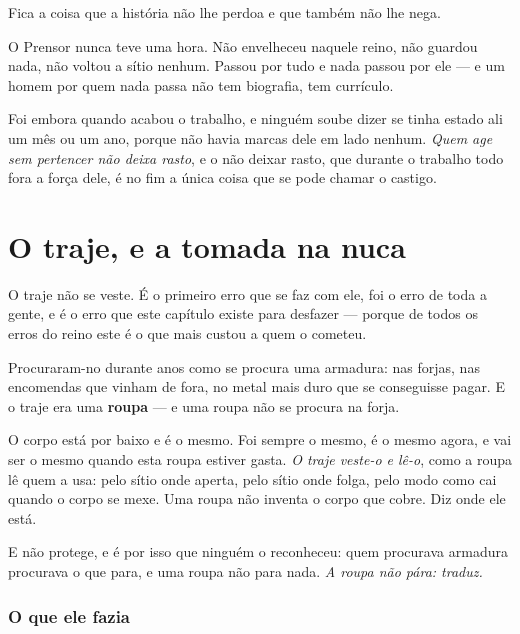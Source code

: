 \documentclass[livro.tex]{subfiles}
\begin{document}
Fica a coisa que a história não lhe perdoa e que também não lhe nega.

\medskip

O Prensor nunca teve uma hora. Não envelheceu naquele reino, não guardou nada, não voltou a sítio
nenhum. Passou por tudo e nada passou por ele --- e um homem por quem nada passa não tem
biografia, tem currículo.

\medskip

Foi embora quando acabou o trabalho, e ninguém soube dizer se tinha estado ali um mês ou um ano,
porque não havia marcas dele em lado nenhum. \emph{Quem age sem pertencer não deixa rasto}, e o
não deixar rasto, que durante o trabalho todo fora a força dele, é no fim a única coisa que se
pode chamar o castigo.





\chapter{O traje, e a tomada na nuca}

O traje não se veste. É o primeiro erro que se faz com ele, foi o erro de toda a gente, e é o erro
que este capítulo existe para desfazer --- porque de todos os erros do reino este é o que mais
custou a quem o cometeu.

\medskip

Procuraram-no durante anos como se procura uma armadura: nas forjas, nas encomendas que vinham de
fora, no metal mais duro que se conseguisse pagar. E o traje era uma \textbf{roupa} --- e uma
roupa não se procura na forja.

\medskip

O corpo está por baixo e é o mesmo. Foi sempre o mesmo, é o mesmo agora, e vai ser o mesmo quando
esta roupa estiver gasta. \emph{O traje veste-o e lê-o}, como a roupa lê quem a usa: pelo sítio
onde aperta, pelo sítio onde folga, pelo modo como cai quando o corpo se mexe. Uma roupa não
inventa o corpo que cobre. Diz onde ele está.

\medskip

E não protege, e é por isso que ninguém o reconheceu: quem procurava armadura procurava o que
para, e uma roupa não para nada. \emph{A roupa não pára: traduz.}

\subsection*{O que ele fazia}
\end{document}
